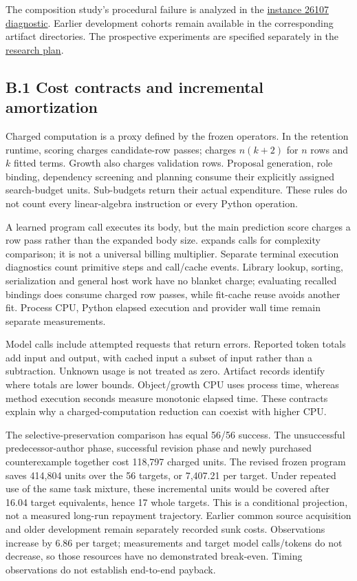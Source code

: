 \documentclass[11pt,a4paper]{article}
\begin{document}
The composition study's procedural failure is analyzed in the \hyperlink{artifact-41}{instance 26107 diagnostic}. Earlier development cohorts remain available in the corresponding artifact directories. The prospective experiments are specified separately in the \hyperlink{artifact-42}{research plan}.


\subsection*{B.1 Cost contracts and incremental amortization}

Charged computation is a proxy defined by the frozen operators. In the retention runtime, scoring charges candidate-row passes;  charges \(n(k+2)\) for \(n\) rows and \(k\) fitted terms. Growth also charges validation rows. Proposal generation, role binding, dependency screening and planning consume their explicitly assigned search-budget units. Sub-budgets return their actual expenditure. These rules do not count every linear-algebra instruction or every Python operation.


A learned program call executes its body, but the main prediction score charges a row pass rather than the expanded body size.  expands calls for complexity comparison; it is not a universal billing multiplier. Separate terminal execution diagnostics count primitive steps and call/cache events. Library lookup, sorting, serialization and general host work have no blanket charge; evaluating recalled bindings does consume charged row passes, while fit-cache reuse avoids another fit. Process CPU, Python elapsed execution and provider wall time remain separate measurements.


Model calls include attempted requests that return errors. Reported token totals add input and output, with cached input a subset of input rather than a subtraction. Unknown usage is not treated as zero. Artifact records identify where totals are lower bounds. Object/growth CPU uses process time, whereas method execution seconds measure monotonic elapsed time. These contracts explain why a charged-computation reduction can coexist with higher CPU.


The selective-preservation comparison has equal 56/56 success. The unsuccessful predecessor-author phase, successful revision phase and newly purchased counterexample together cost 118,797 charged units. The revised frozen program saves 414,804 units over the 56 targets, or 7,407.21 per target. Under repeated use of the same task mixture, these incremental units would be covered after 16.04 target equivalents, hence 17 whole targets. This is a conditional projection, not a measured long-run repayment trajectory. Earlier common source acquisition and older development remain separately recorded sunk costs. Observations increase by 6.86 per target; measurements and target model calls/tokens do not decrease, so those resources have no demonstrated break-even. Timing observations do not establish end-to-end payback.
\end{document}

